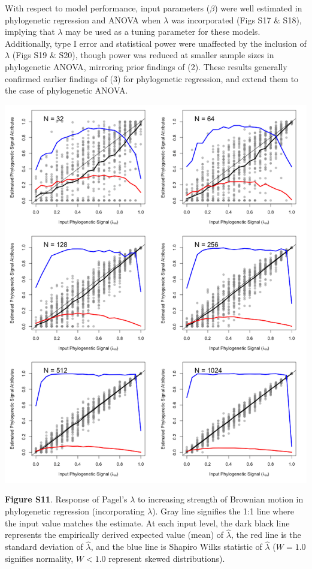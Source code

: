 \documentclass[
]{article}
\begin{document}
With respect to model performance, input parameters (\(\beta\)) were
well estimated in phylogenetic regression and ANOVA when \(\lambda\) was
incorporated (Figs S17 \& S18), implying that \(\lambda\) may be used as
a tuning parameter for these models. Additionally, type I error and
statistical power were unaffected by the inclusion of \(\lambda\) (Figs
S19 \& S20), though power was reduced at smaller sample sizes in
phylogenetic ANOVA, mirroring prior findings of (2). These results
generally confirmed earlier findings of (3) for phylogenetic regression,
and extend them to the case of phylogenetic ANOVA.

\includegraphics[width=0.95\linewidth]{fig.S11}

\textbf{Figure S11}. Response of Pagel's \(\lambda\) to increasing
strength of Brownian motion in phylogenetic regression (incorporating
\(\lambda\)). Gray line signifies the 1:1 line where the input value
matches the estimate. At each input level, the dark black line
represents the empirically derived expected value (mean) of
\(\hat\lambda\), the red line is the standard deviation of
\(\hat\lambda\), and the blue line is Shapiro Wilks statistic of
\(\hat\lambda\) (\(W=1.0\) signifies normality, \(W< 1.0\) represent
skewed distributions).
\end{document}
